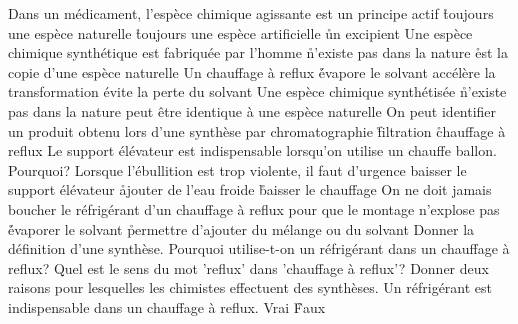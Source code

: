 \q
Dans un médicament, l'espèce chimique agissante est
\rv
un principe actif
\r
toujours une espèce naturelle
\r
toujours une espèce artificielle
\r
un excipient
\q
Une espèce chimique synthétique
\rv
est fabriquée par l'homme
\r
n'existe pas dans la nature
\r
est la copie d'une espèce naturelle
\q
Un chauffage à reflux
\r
évapore le solvant
\rv
accélère la transformation
\rv
évite la perte du solvant
\q
Une espèce chimique synthétisée
\r
n'existe pas dans la nature
\rv
peut être identique à une espèce naturelle
\q
On peut identifier un produit obtenu lors d'une synthèse par
\rv
chromatographie
\r
filtration
\r
chauffage à reflux
\q
Le support élévateur est indispensable lorsqu'on utilise un chauffe ballon. Pourquoi?
\q
Lorsque l'ébullition est trop violente, il faut d'urgence
\rv
baisser le support élévateur
\r
ajouter de l'eau froide
\r
baisser le chauffage
\q
On ne doit jamais boucher le réfrigérant d'un chauffage à reflux pour
\rv
que le montage n'explose pas
\r
évaporer le solvant
\r
permettre d'ajouter du mélange ou du solvant
\q
Donner la définition d'une synthèse.
\q
Pourquoi utilise-t-on un réfrigérant dans un chauffage à reflux?
\q
Quel est le sens du mot 'reflux' dans 'chauffage à reflux'?
\q
Donner deux raisons pour lesquelles les chimistes effectuent des synthèses.
\q
Un réfrigérant est indispensable dans un chauffage à reflux.
\rv
Vrai
\r
Faux



